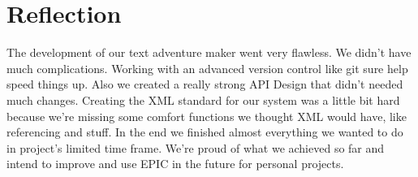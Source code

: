 \chapter{Reflection}
The development of our text adventure maker went very flawless. We didn't have much complications. Working with an advanced version control like git sure help speed things up. Also we created a really strong API Design that didn't needed much changes. Creating the XML standard for our system was a little bit hard because we're missing some comfort functions we thought XML would have, like referencing and stuff. In the end we finished almost everything we wanted to do in project's limited time frame. We're proud of what we achieved so far and intend to improve and use EPIC in the future for personal projects.

